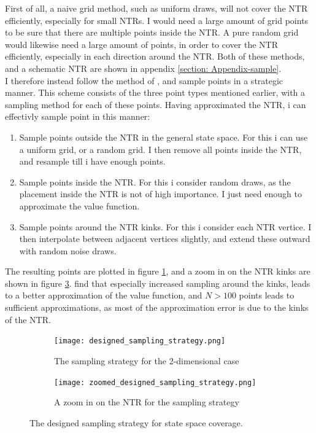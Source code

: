 \documentclass[11pt]{article}
\begin{document}
First of all, a naive grid method, such as uniform draws, will not cover the \ac{NTR} efficiently, especially for small \ac{NTR}s.
I would need a large amount of grid points to be sure that there are multiple points inside the NTR.
A pure random grid would likewise need a large amount of points, in order to cover the \ac{NTR} efficiently, especially in each direction around the NTR.
Both of these methods, and a schematic \ac{NTR} are shown in appendix \ref{section: Appendix-sample}.\\
I therefore instead follow the method of \autocite{Scheidegger2023}, and sample points in a strategic manner.
This scheme consists of the three point types mentioned earlier, with a sampling method for each of these points.
Having approximated the \ac{NTR}, i can effectivly sample point in this manner:
\begin{enumerate}
  \item Sample points outside the \ac{NTR} in the general state space. For this i can use a uniform grid, or a random grid. I then remove all points inside the \ac{NTR}, and resample till i have enough points.
  \item Sample points inside the \ac{NTR}. For this i consider random draws, as the placement inside the NTR is not of high importance. I just need enough to approximate the value function.
  \item Sample points around the \ac{NTR} kinks. For this i consider each \ac{NTR} vertice. I then interpolate between adjacent vertices slightly, and extend these outward with random noise draws. 
\end{enumerate}
The resulting points are plotted in figure \ref{fig: Designed_sampling_strategy}, and a zoom in on the \ac{NTR} kinks are shown in figure \ref{fig: Designed_sampling_strategy-zoom}.
\autocite{Scheidegger2023} find that especially increased sampling around the kinks, leads to a better approximation of the value function,
and $N>100$ points leads to sufficient approximations, as most of the approximation error is due to the kinks of the \ac{NTR}.

\begin{figure}[!ht]
  \centering
    \begin{subfigure}[t]{0.48\textwidth}
        \centering
        \texttt{[image: designed\_sampling\_strategy.png]}
        \caption{The sampling strategy for the 2-dimensional case}
        \label{fig: Designed_sampling_strategy}
    \end{subfigure}%
    \hfill
    \begin{subfigure}[t]{0.48\textwidth}
        \centering
        \texttt{[image: zoomed\_designed\_sampling\_strategy.png]}
        \caption{A zoom in on the \ac{NTR} for the sampling strategy}
        \label{fig: Designed_sampling_strategy-zoom}
    \end{subfigure}

\caption{The designed sampling strategy for state space coverage.}
\end{figure}
\end{document}
